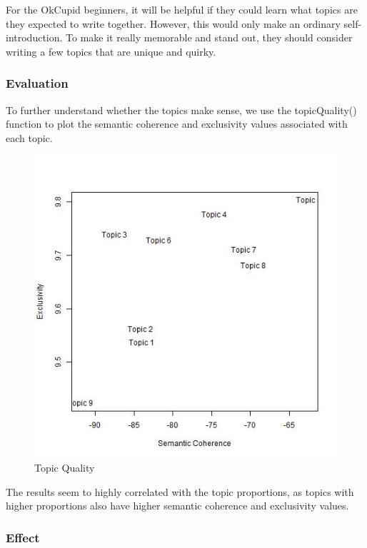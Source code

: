 \documentclass[]{article}
\begin{document}
For the OkCupid beginners, it will be helpful if they could learn what
topics are they expected to write together. However, this would only
make an ordinary self-introduction. To make it really memorable and
stand out, they should consider writing a few topics that are unique and
quirky.

\hypertarget{evaluation}{%
\subsubsection{Evaluation}\label{evaluation}}

To further understand whether the topics make sense, we use the
topicQuality() function to plot the semantic coherence and exclusivity
values associated with each topic.

\begin{figure}
\centering
\includegraphics{Plots/topicQuality.jpeg}
\caption{Topic Quality}
\end{figure}

The results seem to highly correlated with the topic proportions, as
topics with higher proportions also have higher semantic coherence and
exclusivity values.

\hypertarget{effect}{%
\subsubsection{Effect}\label{effect}}
\end{document}
